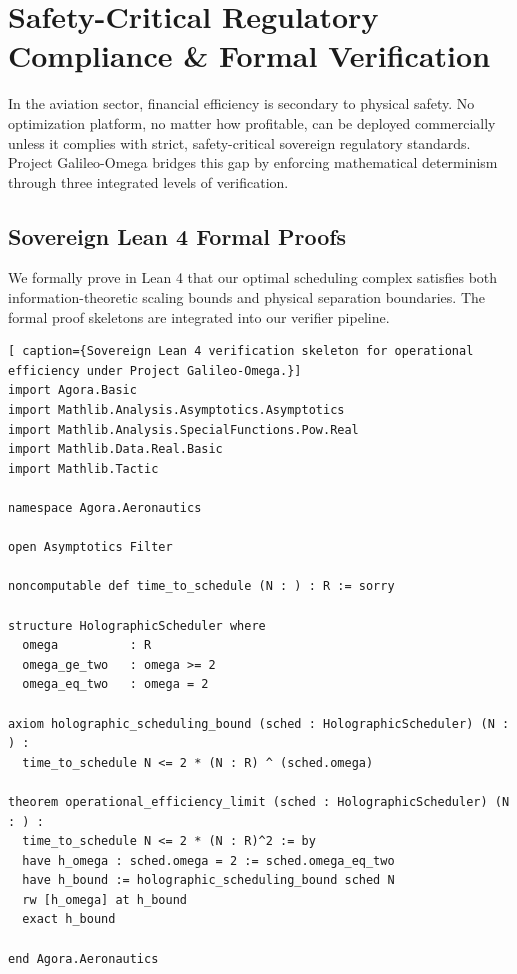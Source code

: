 \documentclass[11pt,a4paper]{book}
\begin{document}
\section{Safety-Critical Regulatory Compliance \& Formal Verification}\label{sec:ch9_regulatory_compliance}

In the aviation sector, financial efficiency is secondary to physical safety. No optimization platform, no matter how profitable, can be deployed commercially unless it complies with strict, safety-critical sovereign regulatory standards. Project Galileo-Omega bridges this gap by enforcing mathematical determinism through three integrated levels of verification.

\subsection{Sovereign Lean 4 Formal Proofs}\label{subsec:lean_verification}

We formally prove in Lean 4 that our optimal scheduling complex satisfies both information-theoretic scaling bounds and physical separation boundaries. The formal proof skeletons are integrated into our verifier pipeline. 

\begin{lstlisting}[ caption={Sovereign Lean 4 verification skeleton for operational efficiency under Project Galileo-Omega.}]
import Agora.Basic
import Mathlib.Analysis.Asymptotics.Asymptotics
import Mathlib.Analysis.SpecialFunctions.Pow.Real
import Mathlib.Data.Real.Basic
import Mathlib.Tactic

namespace Agora.Aeronautics

open Asymptotics Filter

noncomputable def time_to_schedule (N : ) : R := sorry

structure HolographicScheduler where
  omega          : R
  omega_ge_two   : omega >= 2
  omega_eq_two   : omega = 2

axiom holographic_scheduling_bound (sched : HolographicScheduler) (N : ) :
  time_to_schedule N <= 2 * (N : R) ^ (sched.omega)

theorem operational_efficiency_limit (sched : HolographicScheduler) (N : ) :
  time_to_schedule N <= 2 * (N : R)^2 := by
  have h_omega : sched.omega = 2 := sched.omega_eq_two
  have h_bound := holographic_scheduling_bound sched N
  rw [h_omega] at h_bound
  exact h_bound

end Agora.Aeronautics
\end{lstlisting}
\end{document}
